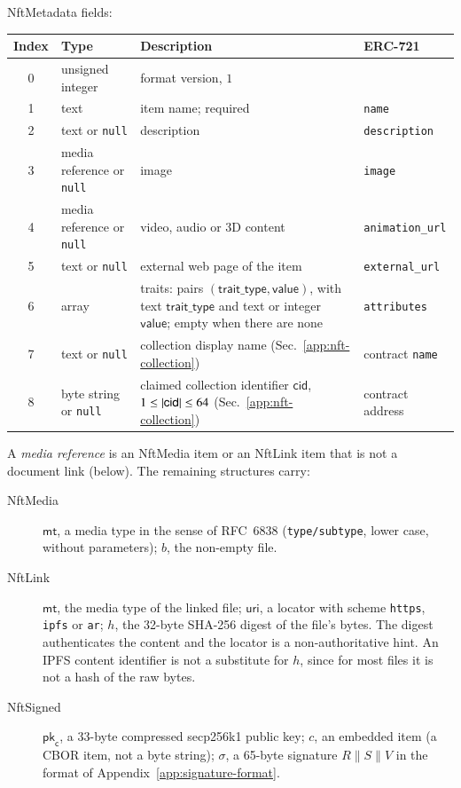 NftMetadata fields:

\begin{longtable}{c>{\raggedright\arraybackslash}p{3.1cm}>{\raggedright\arraybackslash}p{5.6cm}l}
\textbf{Index} & \textbf{Type} & \textbf{Description} & \textbf{ERC-721} \\
\hline
\endhead
0 & unsigned integer & format version, $1$ & \\
1 & text & item name; required & \texttt{name} \\
2 & text or \texttt{null} & description & \texttt{description} \\
3 & media reference or \texttt{null} & image & \texttt{image} \\
4 & media reference or \texttt{null} & video, audio or 3D content & \texttt{animation\_url} \\
5 & text or \texttt{null} & external web page of the item & \texttt{external\_url} \\
6 & array & traits: pairs $(\mathsf{trait\_type}, \mathsf{value})$, with text $\mathsf{trait\_type}$ and text or integer $\mathsf{value}$; empty when there are none & \texttt{attributes} \\
7 & text or \texttt{null} & collection display name (Sec.~\ref{app:nft-collection}) & contract \texttt{name} \\
8 & byte string or \texttt{null} & claimed collection identifier $\mathsf{cid}$, $1 \le \left|\mathsf{cid}\right| \le 64$ (Sec.~\ref{app:nft-collection}) & contract address \\
\end{longtable}

\noindent A \emph{media reference} is an NftMedia item or an NftLink item that is not a document link (below). The remaining structures carry:
\begin{description}
	\item[NftMedia] $\mathsf{mt}$, a media type in the sense of RFC~6838 (\texttt{type/subtype}, lower case, without parameters); $b$, the non-empty file.
	\item[NftLink] $\mathsf{mt}$, the media type of the linked file; $\mathsf{uri}$, a locator with scheme \texttt{https}, \texttt{ipfs} or \texttt{ar}; $h$, the 32-byte SHA-256 digest of the file's bytes. The digest authenticates the content and the locator is a non-authoritative hint. An IPFS content identifier is not a substitute for $h$, since for most files it is not a hash of the raw bytes.
	\item[NftSigned] $\mathsf{pk}_\mathsf{c}$, a 33-byte compressed secp256k1 public key; $c$, an embedded item (a CBOR item, not a byte string); $\sigma$, a 65-byte signature $R \mathbin{\|} S \mathbin{\|} V$ in the format of Appendix~\ref{app:signature-format}.
\end{description}

